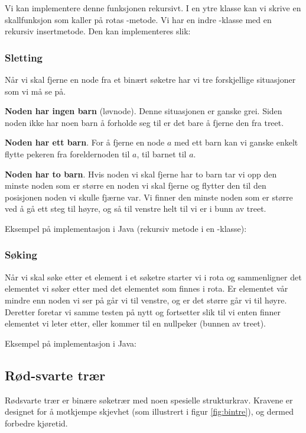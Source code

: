 Vi kan implementere denne funksjonen rekursivt. I en ytre klasse kan vi skrive en skallfunksjon som kaller på rotas -metode. Vi har en indre -klasse med en rekursiv insertmetode. Den kan implementeres slik:


\subsubsection{Sletting}
Når vi skal fjerne en node fra et binært søketre har vi tre forskjellige situasjoner som vi må se på.

{\bfseries Noden har ingen barn} (løvnode). Denne situasjonen er ganske grei. Siden noden ikke har noen barn å forholde seg til er det bare å fjerne den fra treet.

{\bfseries Noden har ett barn}. For å fjerne en node $ a $ med ett barn kan vi ganske enkelt flytte pekeren fra foreldernoden til $ a $, til barnet til $ a $.

{\bfseries Noden har to barn}. Hvis noden vi skal fjerne har to barn tar vi opp den minste noden som er større en noden vi skal fjerne og flytter den til den posisjonen noden vi skulle fjærne var. Vi finner den minste noden som er større ved å gå ett steg til høyre, og så til venstre helt til vi er i bunn av treet. 

Eksempel på implementasjon i Java (rekursiv metode i en -klasse):


\subsubsection{Søking}
Når vi skal søke etter et element i et søketre starter vi i rota og sammenligner det elementet vi søker etter med det elementet som finnes i rota. Er elementet vår mindre enn noden vi ser på går vi til venstre, og er det større går vi til høyre. Deretter foretar vi samme testen på nytt og fortsetter slik til vi enten finner elementet vi leter etter, eller kommer til en nullpeker (bunnen av treet).

Eksempel på implementasjon i Java:




\subsection{Rød-svarte trær} \label{rb_tre}
Rødsvarte trær er binære søketrær med noen spesielle strukturkrav. Kravene er designet for å motkjempe skjevhet (som illustrert i figur \ref{fig:bintre}), og dermed forbedre kjøretid.

